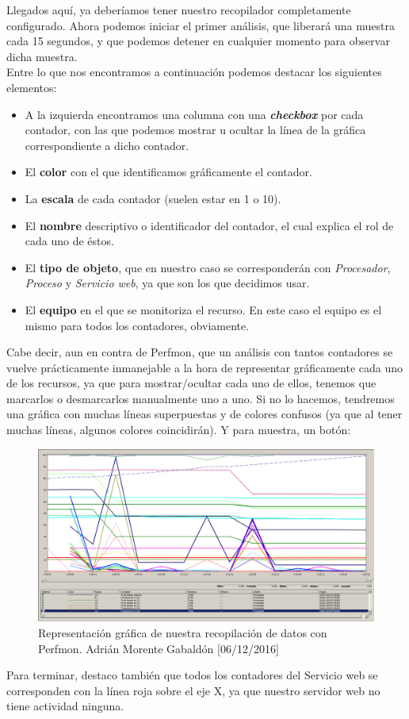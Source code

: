 Llegados aquí, ya deberíamos tener nuestro recopilador completamente configurado. Ahora podemos iniciar el primer análisis, que liberará una muestra cada 15 segundos, y que podemos detener en cualquier momento para observar dicha muestra. \\
Entre lo que nos encontramos a continuación podemos destacar los siguientes elementos:
\begin{itemize}
	\item A la izquierda encontramos una columna con una \emph{\textbf{checkbox}} por cada contador, con las que podemos mostrar u ocultar la línea de la gráfica correspondiente a dicho contador.
	\item El \textbf{color} con el que identificamos gráficamente el contador.
	\item La \textbf{escala} de cada contador (suelen estar en 1 o 10).
	\item El \textbf{nombre} descriptivo o identificador del contador, el cual explica el rol de cada uno de éstos.
	\item El \textbf{tipo de objeto}, que en nuestro caso se corresponderán con \emph{Procesador}, \emph{Proceso} y \emph{Servicio web}, ya que son los que decidimos usar.
	\item El \textbf{equipo} en el que se monitoriza el recurso. En este caso el equipo es el mismo para todos los contadores, obviamente.
\end{itemize}
Cabe decir, aun en contra de Perfmon, que un análisis con tantos contadores se vuelve prácticamente inmanejable a la hora de representar gráficamente cada uno de los recursos, ya que para mostrar/ocultar cada uno de ellos, tenemos que marcarlos o desmarcarlos manualmente uno a uno. Si no lo hacemos, tendremos una gráfica con muchas líneas superpuestas y de colores confusos (ya que al tener muchas líneas, algunos colores coincidirán). Y para muestra, un botón:
\begin{figure}[H]
	\centering
	\includegraphics[scale=0.35]{recop4}
	\caption{Representación gráfica de nuestra recopilación de datos con Perfmon. Adrián Morente Gabaldón [06/12/2016]}
	\label{figura15}
\end{figure}
Para terminar, destaco también que todos los contadores del Servicio web se corresponden con la línea roja sobre el eje X, ya que nuestro servidor web no tiene actividad ninguna.


